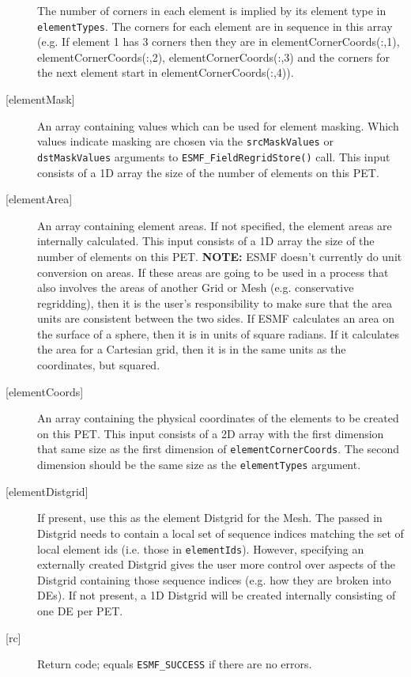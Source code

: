 \begin{description}
           The number of corners in each element is implied by its element type in
           {\tt elementTypes}. The corners for each element
           are in sequence in this array (e.g. If element 1 has 3 corners then they are in elementCornerCoords(:,1),
           elementCornerCoords(:,2), elementCornerCoords(:,3) and the corners for the next element start in elementCornerCoords(:,4)).
     \item [{[elementMask]}]
            An array containing values which can be used for element masking. Which values indicate
            masking are chosen via the {\tt srcMaskValues} or {\tt dstMaskValues} arguments to
            {\tt ESMF\_FieldRegridStore()} call. This input consists of a 1D array the
            size of the number of elements on this PET.
     \item [{[elementArea]}]
            An array containing element areas. If not specified, the element areas are internally calculated.
            This input consists of a 1D array the size of the number of elements on this PET.
            {\bf NOTE:} ESMF doesn't currently do unit conversion on areas. If these areas are going to be used
                  in a process that also involves the areas of another Grid or Mesh (e.g. conservative regridding), then
                  it is the user's responsibility to make sure that the area units are consistent between the two sides.
                  If ESMF calculates an area on the surface of a sphere, then it is in units of square radians. If
                  it calculates the area for a Cartesian grid, then it is in the same units as the coordinates, but squared.
     \item[{[elementCoords]}]
            An array containing the physical coordinates of the elements to be created on this
            PET. This input consists of a 2D array with the first dimension that same size as the first dimension of {\tt elementCornerCoords}.
            The second dimension should be the same size as the {\tt elementTypes} argument.
     \item [{[elementDistgrid]}]
            If present, use this as the element Distgrid for the Mesh.
            The passed in Distgrid
            needs to contain a local set of sequence indices matching the set of local element ids (i.e. those in {\tt elementIds}).
            However, specifying an externally created Distgrid gives the user more control over aspects of
            the Distgrid containing those sequence indices (e.g. how they are broken into DEs).
            If not present, a 1D Distgrid will be created internally consisting of one DE per PET.
     \item [{[rc]}]
           Return code; equals {\tt ESMF\_SUCCESS} if there are no errors.
     \end{description}
   
